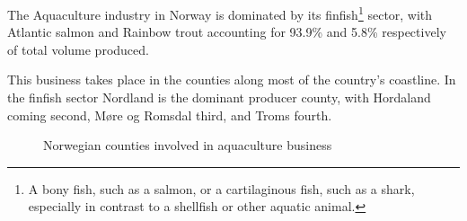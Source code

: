 The Aquaculture industry in Norway is dominated by its finfish\footnote{A bony fish, such as a salmon, or a cartilaginous fish, such as a shark, especially in contrast to a shellfish or other aquatic animal.} sector, with Atlantic salmon and Rainbow trout accounting for 93.9\% and 5.8\% respectively of total volume produced.

This business takes place in the counties along most of the country's coastline. In the finfish sector Nordland is the dominant producer county, with Hordaland coming second, Møre og Romsdal third, and Troms fourth.

\begin{figure}[h]
    \caption[Norwegian counties involved in aquaculture business]{Norwegian counties involved in aquaculture business}
    \label{fig: Norway_Counties}
\end{figure}